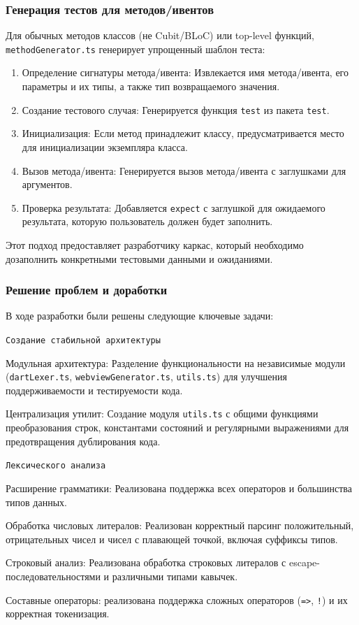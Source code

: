 \documentclass[14pt, russian]{scrartcl}
\begin{document}
\subsubsection{Генерация тестов для методов/ивентов}

Для обычных методов классов (не Cubit/BLoC) или top-level функций, \texttt{methodGenerator.ts} генерирует упрощенный шаблон теста:
\begin{enumerate}
    \item Определение сигнатуры метода/ивента: Извлекается имя метода/ивента, его параметры и их типы, а также тип возвращаемого значения.
    \item Создание тестового случая: Генерируется функция \texttt{test} из пакета \texttt{test}.
    \item Инициализация: Если метод принадлежит классу, предусматривается место для инициализации экземпляра класса.
    \item Вызов метода/ивента: Генерируется вызов метода/ивента с заглушками для аргументов.
    \item Проверка результата: Добавляется \texttt{expect} с заглушкой для ожидаемого результата, которую пользователь должен будет заполнить.
\end{enumerate}
Этот подход предоставляет разработчику каркас, который необходимо дозаполнить конкретными тестовыми данными и ожиданиями.

\subsubsection{Решение проблем и доработки}
В ходе разработки были решены следующие ключевые задачи:

\texttt{Создание стабильной архитектуры}
\begin{itemize*}
    \item Модульная архитектура: Разделение функциональности на независимые модули (\texttt{dartLexer.ts}, \texttt{webviewGenerator.ts}, \texttt{utils.ts}) для улучшения поддерживаемости и тестируемости кода.
    \item Централизация утилит: Создание модуля \texttt{utils.ts} с общими функциями преобразования строк, константами состояний и регулярными выражениями для предотвращения дублирования кода.
\end{itemize*}

\texttt{Лексического анализа}
\begin{itemize*}
    \item Расширение грамматики: Реализована поддержка всех операторов и большинства типов данных.
    \item Обработка числовых литералов: Реализован корректный парсинг положительный, отрицательных чисел и чисел с плавающей точкой, включая суффиксы типов.
    \item Строковый анализ: Реализована обработка строковых литералов с escape-последовательностями и различными типами кавычек.
    \item Составные операторы: реализована поддержка сложных операторов (\texttt{=>}, \texttt{!}) и их корректная токенизация.
\end{itemize*}
\end{document}
